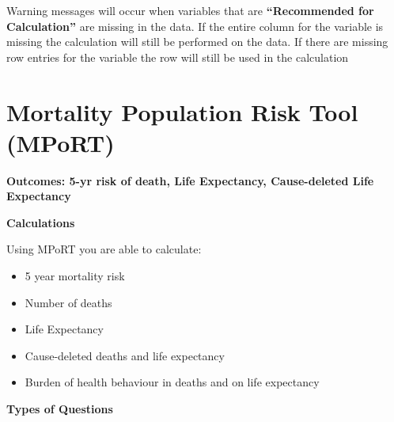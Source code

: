 \documentclass[]{book}
\providecommand{\tightlist}{%
  \setlength{\itemsep}{0pt}\setlength{\parskip}{0pt}}
\begin{document}
Warning messages will occur when variables that are
\textbf{``Recommended for Calculation''} are missing in the data. If the
entire column for the variable is missing the calculation will still be
performed on the data. If there are missing row entries for the variable
the row will still be used in the calculation


















































\appendix


\chapter{Mortality Population Risk Tool
(MPoRT)}\label{mortality-population-risk-tool-mport}

\textbf{Outcomes: 5-yr risk of death, Life Expectancy, Cause-deleted
Life Expectancy}

\textbf{Calculations}

Using MPoRT you are able to calculate:

\begin{itemize}
\tightlist
\item
  5 year mortality risk
\item
  Number of deaths
\item
  Life Expectancy
\item
  Cause-deleted deaths and life expectancy
\item
  Burden of health behaviour in deaths and on life expectancy
\end{itemize}

\textbf{Types of Questions}
\end{document}
